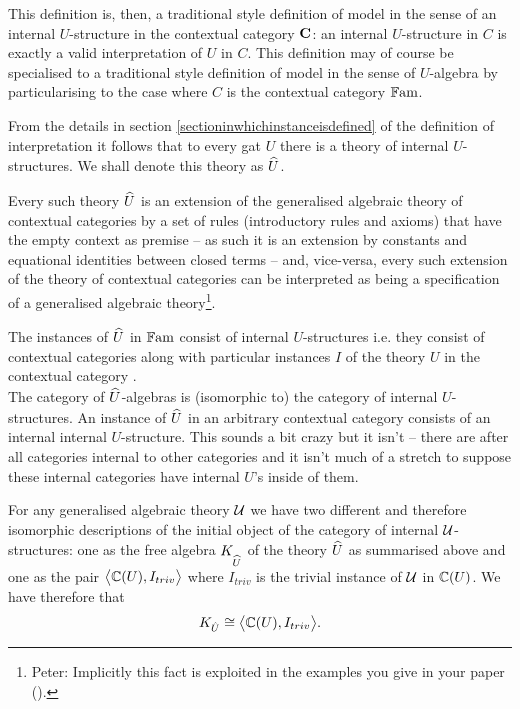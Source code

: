 {\note
This definition is, then, a traditional style definition  of model in the sense of an internal $U$-structure in the contextual category $\catc$:
an internal $U$-structure in $C$ is exactly 
a valid interpretation of $U$ in $C$. This definition may of course be specialised to a traditional style definition of model in the sense of
$U$-algebra by particularising to the case where $C$ is the contextual category $\Fam$.

\note 
From the details  in
section \ref{sectioninwhichinstanceisdefined} 
of the definition of interpretation
it follows that 
to every gat $U$ there is a theory of internal $U$-structures. We shall denote this theory as $\hatU$.

Every such theory $\hatU$ is an extension of the generalised algebraic theory of contextual categories
by a set of rules (introductory rules and axioms) that have  the empty context as premise -- as such it is an extension
by constants and equational identities between closed terms -- and, vice-versa, every such extension of
the theory of contextual categories can be interpreted as being a specification of a generalised algebraic theory\footnote{Peter: 
Implicitly this fact is exploited in the examples you give in your paper (\cite{BCDEpaper}).}.

\note 
The instances of $\hatU$  in $\Fam$ consist of  internal $U$-structures  i.e. they consist of contextual categories \catcw along with particular instances $I$ of
the theory $U$ in the contextual category \catc. \\
The category of $\hatU$-algebras is (isomorphic to) the category of internal $U$-structures.
\note
An instance of $\hatU$ in an arbitrary contextual category
consists of  an internal internal $U$-structure. This sounds a bit crazy but it isn't -- there are after all categories internal to other categories and it isn't much of a stretch to suppose these internal categories have internal $U$'s inside of them. 



\note
\label{termmodelEQfreealgebra}For any generalised algebraic theory $\gat[U]$ we have two different 
and therefore isomorphic descriptions of the initial object of the category of internal $\gatU$-structures:
one as the free algebra $K_{\hatU}$ of the theory $\hatU$ as summarised above and one  as the pair $\bigtuple{\CofU, I_{triv}}$ 
where $I_{triv}$ is the trivial instance of $\gatU$ in $\CofU$. We have therefore that
\begin{equation}
K_{\hat{U}} \cong \bigtuple{\CofU, I_{triv}}.
\end{equation}

}
